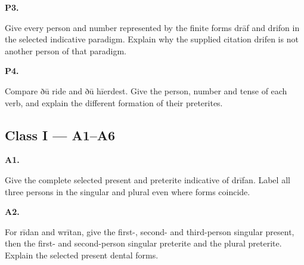 \par\begin{minipage}{\linewidth}\raggedright
\textbf{P3.}

Give every person and number represented by the finite forms drāf and drifon in the selected indicative paradigm. Explain why the supplied citation drifen is not another person of that paradigm.

\end{minipage}\par\addvspace{4pt}

\par\begin{minipage}{\linewidth}\raggedright
\textbf{P4.}

Compare ðū ride and ðū hīerdest. Give the person, number and tense of each verb, and explain the different formation of their preterites.

\end{minipage}\par\addvspace{4pt}

\subsection*{Class I — A1–A6}

\par\begin{minipage}{\linewidth}\raggedright
\textbf{A1.}

Give the complete selected present and preterite indicative of drīfan. Label all three persons in the singular and plural even where forms coincide.

\end{minipage}\par\addvspace{4pt}

\par\begin{minipage}{\linewidth}\raggedright
\textbf{A2.}

For rīdan and wrītan, give the first-, second- and third-person singular present, then the first- and second-person singular preterite and the plural preterite. Explain the selected present dental forms.

\end{minipage}\par\addvspace{4pt}

